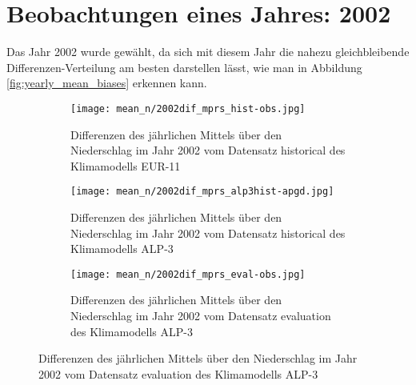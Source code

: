 \section{Beobachtungen eines Jahres: 2002}
Das Jahr 2002 wurde gewählt, da sich mit diesem Jahr die nahezu gleichbleibende Differenzen-Verteilung am besten darstellen lässt, wie man in Abbildung \ref{fig:yearly_mean_biases} erkennen kann.
\begin{figure}[hbt!]
		\begin{subfigure}{0.49\textwidth}
			\texttt{[image: mean\_n/2002dif\_mprs\_hist-obs.jpg]}
			\caption{Differenzen des jährlichen Mittels über den Niederschlag im Jahr 2002 vom Datensatz historical des Klimamodells EUR-11}
			\label{fig:eur11_hist_dif22}
		\end{subfigure}
		\begin{subfigure}{0.49\textwidth}
			\texttt{[image: mean\_n/2002dif\_mprs\_alp3hist-apgd.jpg]}
			\caption{Differenzen des jährlichen Mittels über den Niederschlag im Jahr 2002 vom Datensatz historical des Klimamodells ALP-3}
			\label{fig:alp3_hist_dif22}
		\end{subfigure}
		\begin{subfigure}{0.49\textwidth}
			\texttt{[image: mean\_n/2002dif\_mprs\_eval-obs.jpg]}
			\caption{Differenzen des jährlichen Mittels über den Niederschlag im Jahr 2002 vom Datensatz evaluation des Klimamodells ALP-3}
			\label{fig:alp3_hist_dif22}
		\end{subfigure}
\end{figure}



